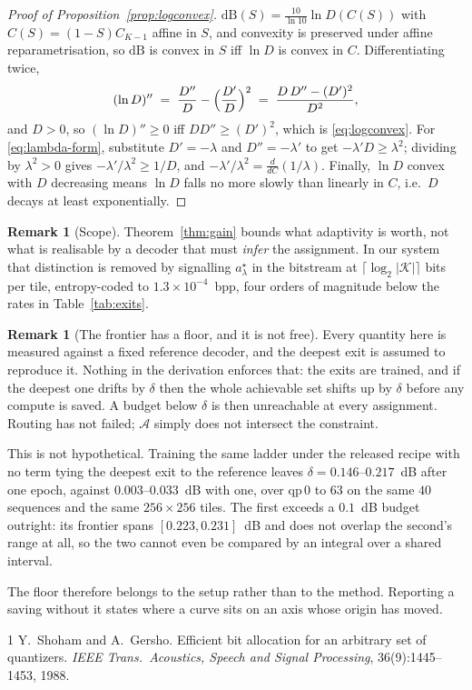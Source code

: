 \documentclass[10pt]{article}
\theoremstyle{plain}
\theoremstyle{definition}
\newtheorem{remark}[theorem]{Remark}
\begin{document}
\begin{proof}[Proof of Proposition~\ref{prop:logconvex}]
$\mathrm{dB}(S)=\frac{10}{\ln 10}\ln D(C(S))$ with $C(S)=(1-S)C_{K-1}$ affine in
$S$, and convexity is preserved under affine reparametrisation, so
$\mathrm{dB}$ is convex in $S$ iff $\ln D$ is convex in $C$. Differentiating
twice,
\[
(\ln D)'' \;=\; \frac{D''}{D}-\Bigl(\frac{D'}{D}\Bigr)^2
\;=\;\frac{D\,D''-(D')^2}{D^2},
\]
and $D>0$, so $(\ln D)''\ge0$ iff $D D''\ge (D')^2$, which is
\eqref{eq:logconvex}. For \eqref{eq:lambda-form}, substitute $D'=-\lambda$ and
$D''=-\lambda'$ to get $-\lambda' D\ge\lambda^2$; dividing by $\lambda^2>0$ gives
$-\lambda'/\lambda^2\ge 1/D$, and $-\lambda'/\lambda^2=\frac{d}{dC}(1/\lambda)$.
Finally, $\ln D$ convex with $D$ decreasing means $\ln D$ falls no more slowly
than linearly in $C$, i.e.\ $D$ decays at least exponentially.
\end{proof}

\begin{remark}[Scope]
Theorem~\ref{thm:gain} bounds what adaptivity is worth, not what is realisable
by a decoder that must \emph{infer} the assignment. In our system that
distinction is removed by signalling $a^\star_\lambda$ in the bitstream at
$\lceil\log_2|\mathcal{K}|\rceil$ bits per tile, entropy-coded to
$1.3\times10^{-4}$~bpp, four orders of magnitude below the rates in
Table~\ref{tab:exits}.
\end{remark}

\begin{remark}[The frontier has a floor, and it is not free]
Every quantity here is measured against a fixed reference decoder, and the
deepest exit is assumed to reproduce it. Nothing in the derivation enforces
that: the exits are trained, and if the deepest one drifts by $\delta$ then the
whole achievable set shifts up by $\delta$ before any compute is saved. A
budget below $\delta$ is then unreachable at every assignment. Routing has not
failed; $\mathcal{A}$ simply does not intersect the constraint.

This is not hypothetical. Training the same ladder under the released recipe
with no term tying the deepest exit to the reference leaves
$\delta = 0.146$--$0.217$~dB after one epoch, against $0.003$--$0.033$~dB with
one, over $\mathrm{qp}\,0$ to $63$ on the same $40$ sequences and the same
$256\times256$ tiles. The first exceeds a $0.1$~dB budget outright: its frontier
spans $[0.223, 0.231]$~dB and does not overlap the second's range at all, so the
two cannot even be compared by an integral over a shared interval.

The floor therefore belongs to the setup rather than to the method. Reporting a
saving without it states where a curve sits on an axis whose origin has moved.
\end{remark}

\begin{thebibliography}{1}\small
{} Y.~Shoham and A.~Gersho. Efficient bit allocation for an
arbitrary set of quantizers. \emph{IEEE Trans.\ Acoustics, Speech and Signal
Processing}, 36(9):1445--1453, 1988.
\end{thebibliography}
\end{document}

